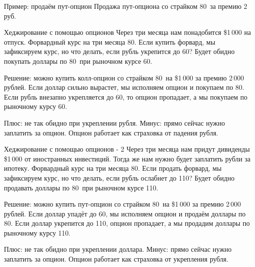 \documentclass{beamer}
\newcommand{\usdrubstrike}{80}
\newcommand{\usdrubaxisspread}{8}
\newcommand{\usdrublow}{60}
\newcommand{\usdrubhigh}{110}
\begin{document}
\begin{frame}{Пример: продаём пут-опцион}
\justifying
Продажа пут-опциона со страйком \usdrubstrike\ за премию 2 руб.

\justifying
\centering
\end{frame}



\begin{frame}{Хеджирование с помощью опционов}
\justify
Через три месяца нам понадобится \$1\,000 на отпуск. Форвардный курс на три месяца \usdrubstrike. Если купить форвард, мы зафиксируем курс, но что делать, если рубль укрепится до \usdrublow? Будет обидно покупать доллары по \usdrubstrike\ при рыночном курсе \usdrublow.

\justify
Решение: можно купить колл-опцион со страйком \usdrubstrike\ на \$1\,000 за премию 2\,000 рублей. Если доллар сильно вырастет, мы исполняем опцион и покупаем по \usdrubstrike. Если рубль внезапно укрепляется до \usdrublow, то опцион пропадает, а мы покупаем по рыночному курсу \usdrublow.

\justify
Плюс: не так обидно при укреплении рубля. Минус: прямо сейчас нужно заплатить за опцион. Опцион работает как страховка от падения рубля.
\end{frame}




\begin{frame}{Хеджирование с помощью опционов - 2}
\justify
Через три месяца нам придут дивиденды \$1\,000 от иностранных инвестиций. Тогда же нам нужно будет заплатить рубли за ипотеку. Форвардный курс на три месяца \usdrubstrike. Если продать форвард, мы зафиксируем курс, но что делать, если рубль ослабнет до \usdrubhigh? Будет обидно продавать доллары по \usdrubstrike\ при рыночном курсе \usdrubhigh.

\justify
Решение: можно купить пут-опцион со страйком \usdrubstrike\ на \$1\,000 за премию 2\,000 рублей. Если доллар упадёт до \usdrublow, мы исполняем опцион и продаём доллары по \usdrubstrike. Если доллар укрепится до \usdrubhigh, опцион пропадает, а мы продадим доллары по рыночному курсу \usdrubhigh.

\justify
Плюс: не так обидно при укреплении доллара. Минус: прямо сейчас нужно заплатить за опцион. Опцион работает как страховка от укрепления рубля.
\end{frame}
\end{document}
